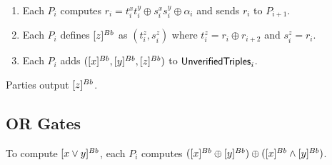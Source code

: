 \begin{protocol}
    \label{protocol:AND}
    \begin{enumerate}
        \item Each $P_i$ computes $r_i = t^x_i t^y_i \oplus s^x_i s^y_i \oplus \alpha_i$ and sends $r_i$ to $P_{i + 1}$.
        \item Each $P_i$ defines $[z]^{Bb}$ as $(t^z_i, s^z_i)$ where $t^z_i = r_i \oplus r_{i + 2}$ and $s^z_i = r_i$.
        \item Each $P_i$ adds $([x]^{Bb}, [y]^{Bb}, [z]^{Bb})$ to ${\sf UnverifiedTriples}_{i}$.
    \end{enumerate}
    Parties output $[z]^{Bb}$.
\end{protocol}

\subsection{OR Gates}

To compute $[x \vee y]^{Bb}$, each $P_i$ computes $([x]^{Bb} \oplus [y]^{Bb}) \oplus ([x]^{Bb} \wedge [y]^{Bb})$.
